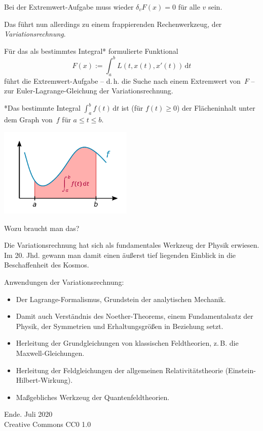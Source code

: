 \documentclass[9pt]{beamer}
\newcommand{\modest}[1]{{\small\color{gray}#1}}
\begin{document}
\begin{frame}
Bei der Extremwert-Aufgabe muss wieder $\delta_v F(x)=0$ für alle
$v$ sein.
\pause

\vspace{0.8em}
Das führt nun allerdings zu einem frappierenden Rechenwerkzeug,
der \emph{Variationsrechnung}.
\end{frame}

\begin{frame}
Für das als bestimmtes Integral* formulierte Funktional
\[F(x) := \int_a^b L(t,x(t),x'(t))\,\mathrm dt\]
führt die Extremwert-Aufgabe -- d.\,h. die Suche nach einem Extremwert
von~$F$ -- zur Euler-Lagrange-Gleichung der Variationsrechnung.
\end{frame}

\begin{frame}

{\footnotesize
*Das bestimmte Integral $\int_a^b f(t)\,\mathrm dt$
ist (für $f(t)\ge 0$) der Flächeninhalt unter dem Graph
von~$f$ für $a\le t\le b$.}
\begin{center}
\includegraphics[width=64mm]{img/Integral.pdf}
\end{center}
\end{frame}

\begin{frame}
Wozu braucht man das?\pause

\vspace{0.8em}
Die Variationsrechnung hat sich als fundamentales Werkzeug der Physik
erwiesen. Im 20. Jhd. gewann man damit einen äußerst tief liegenden
Einblick in die Beschaffenheit des Kosmos.
\end{frame}

\begin{frame}
Anwendungen der Variationsrechnung:
\begin{itemize}
\item Der Lagrange-Formalismus, Grundstein der analytischen Mechanik.

\item Damit auch Verständnis des Noether-Theorems, einem
Fundamentalsatz der Physik, der Symmetrien und Erhaltungsgrößen
in Beziehung setzt.

\item Herleitung der Grundgleichungen von klassischen Feldtheorien,
z.\,B. die Maxwell-Gleichungen.

\item Herleitung der Feldgleichungen der allgemeinen
Relativitätstheorie (Einstein-Hilbert-Wirkung).

\item Maßgebliches Werkzeug der Quantenfeldtheorien.
\end{itemize}
\end{frame}

\begin{frame}
Ende.
\vfill\hfill\modest{Juli 2020}\\
\hfill\modest{Creative Commons CC0 1.0}
\end{frame}
\end{document}
